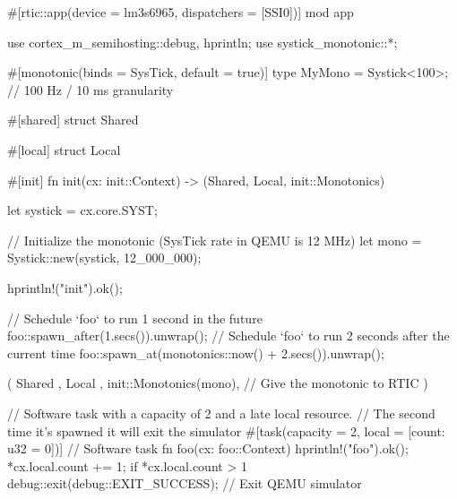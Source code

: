 #[rtic::app(device = lm3s6965, dispatchers = [SSI0])]
mod app {
    use cortex_m_semihosting::{debug, hprintln};
    use systick_monotonic::*;

    #[monotonic(binds = SysTick, default = true)]
    type MyMono = Systick<100>; // 100 Hz / 10 ms granularity

    #[shared]
    struct Shared {}

    #[local]
    struct Local {}

    #[init]
    fn init(cx: init::Context) -> (Shared, Local, init::Monotonics) {
        let systick = cx.core.SYST;

        // Initialize the monotonic (SysTick rate in QEMU is 12 MHz)
        let mono = Systick::new(systick, 12_000_000);

        hprintln!("init").ok();

        // Schedule `foo` to run 1 second in the future
        foo::spawn_after(1.secs()).unwrap();
        // Schedule `foo` to run 2 seconds after the current time
        foo::spawn_at(monotonics::now() + 2.secs()).unwrap();

        (
            Shared {},
            Local {},
            init::Monotonics(mono), // Give the monotonic to RTIC
        )
    }

    // Software task with a capacity of 2 and a late local resource.
    // The second time it's spawned it will exit the simulator
    #[task(capacity = 2, local = [count: u32 = 0])] // Software task
    fn foo(cx: foo::Context) {
        hprintln!("foo").ok();
        *cx.local.count += 1;
        if *cx.local.count > 1{
            debug::exit(debug::EXIT_SUCCESS); // Exit QEMU simulator
        }
    }
}
